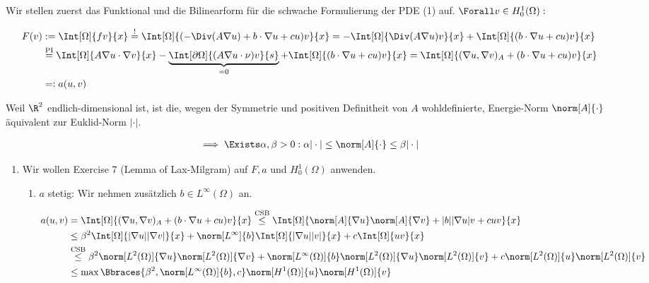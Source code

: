 \begin{solution}

Wir stellen zuerst das Funktional und die Bilinearform für die schwache Formulierung der PDE (1) auf.
$\Forall v \in H_0^1(\Omega):$

\begin{align*}
  F(v)
  & :=
  \Int[\Omega]{f v}{x}
  \stackrel{!}{=}
  \Int[\Omega]{(-\Div(A \nabla u) + b \cdot \nabla u + c u) v}{x}
  =
  -\Int[\Omega]{\Div(A \nabla u) v}{x}
  +
  \Int[\Omega]{(b \cdot \nabla u + c u) v}{x} \\
  & \stackrel
  {
    \mathrm{PI}
  }{=}
  \Int[\Omega]{A \nabla u \cdot \nabla v}{x}
  -
  \underbrace
  {
    \Int[\partial \Omega]{(A \nabla u \cdot \nu) v}{s}
  }_{=0}
  +
  \Int[\Omega]{(b \cdot \nabla u + c u) v}{x}
  =
  \Int[\Omega]{(\nabla u, \nabla v)_A + (b \cdot \nabla u + c u) v}{x} \\
  & =:
  a(u, v)
\end{align*}

Weil $\R^2$ endlich-dimensional ist, ist die, wegen der Symmetrie und positiven Definitheit von $A$ wohldefinierte, Energie-Norm $\norm[A]{\cdot}$ äquivalent zur Euklid-Norm $|\cdot|$.

\begin{align*}
  \implies
  \Exists \alpha, \beta > 0:
  \alpha |\cdot| \leq \norm[A]{\cdot} \leq \beta |\cdot|
\end{align*}

\begin{enumerate}[label = \textbf{\alph*)}]

  \item Wir wollen Exercise 7 (Lemma of Lax-Milgram) auf $F, a$ und $H_0^1(\Omega)$ anwenden.

  \begin{enumerate}[label = \arabic*.]

    \item $a$ stetig: Wir nehmen zusätzlich $b \in L^{\infty}(\Omega)$ an.

    \begin{align*}
      a(u, v)
      & =
      \Int[\Omega]{(\nabla u, \nabla v)_A + (b \cdot \nabla u + c u) v}{x}
      \stackrel
      {
        \mathrm{CSB}
      }{\leq}
      \Int[\Omega]{\norm[A]{\nabla u} \norm[A]{\nabla v} + |b| |\nabla u| v + c u v}{x} \\
      & \leq
      \beta^2 \Int[\Omega]{|\nabla u| |\nabla v|}{x}
      +
      \norm[L^\infty]{b} \Int[\Omega]{|\nabla u| |v|}{x}
      +
      c \Int[\Omega]{u v}{x} \\
      &\stackrel
      {
        \mathrm{CSB}
      }{
      \leq}
      \beta^2 \norm[L^2(\Omega)]{\nabla u} \norm[L^2(\Omega)]{\nabla v}
      +
      \norm[L^\infty(\Omega)]{b} \norm[L^2(\Omega)]{\nabla u} \norm[L^2(\Omega)]{v}
      +
      c \norm[L^2(\Omega)]{u} \norm[L^2(\Omega)]{v} \\
      & \leq
      \max \Bbraces{\beta^2, \norm[L^\infty(\Omega)]{b}, c} \norm[H^1(\Omega)]{u} \norm[H^1(\Omega)]{v}
    \end{align*}


\end{enumerate}
\end{enumerate}
\end{solution}
